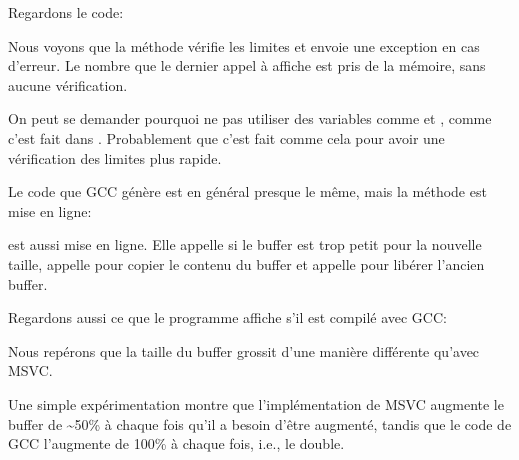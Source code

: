 Regardons le code:



Nous voyons que la méthode  vérifie les limites et envoie une exception
en cas d'erreur.
Le nombre que le dernier appel à \printf affiche est pris de la mémoire, sans aucune
vérification.

On peut se demander pourquoi ne pas utiliser des variables comme  et ,
comme c'est fait dans .
Probablement que c'est fait comme cela pour avoir une vérification des limites plus
rapide.


Le code que GCC génère est en général presque le même, mais la méthode 
est mise en ligne:



 est aussi mise en ligne.
Elle appelle  si le buffer est trop petit pour la nouvelle taille, appelle
 pour copier le contenu du buffer et appelle  pour libérer
l'ancien buffer.

Regardons aussi ce que le programme affiche s'il est compilé avec GCC:



Nous repérons que la taille du buffer grossit d'une manière différente qu'avec MSVC.

Une simple expérimentation montre que l'implémentation de MSVC augmente le buffer de
\textasciitilde{}50\% à chaque fois qu'il a besoin d'être augmenté, tandis que le
code de GCC l'augmente de 100\% à chaque fois, i.e., le double.


